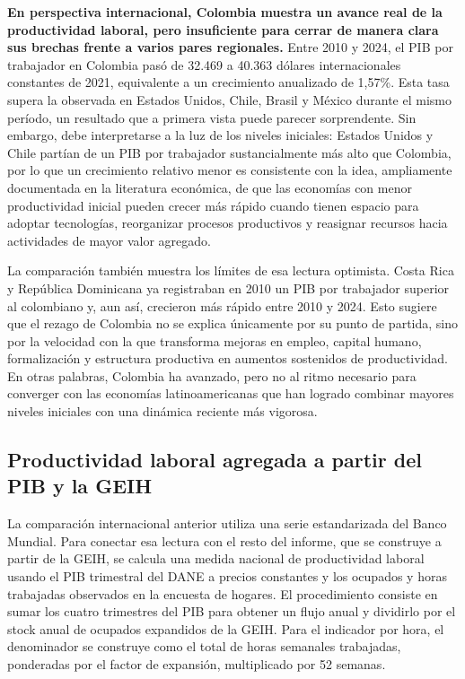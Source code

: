 \textbf{En perspectiva internacional, Colombia muestra un avance real de la productividad laboral, pero insuficiente para cerrar de manera clara sus brechas frente a varios pares regionales.} Entre 2010 y 2024, el PIB por trabajador en Colombia pasó de 32.469 a 40.363 dólares internacionales constantes de 2021, equivalente a un crecimiento anualizado de 1,57\%. Esta tasa supera la observada en Estados Unidos, Chile, Brasil y México durante el mismo período, un resultado que a primera vista puede parecer sorprendente. Sin embargo, debe interpretarse a la luz de los niveles iniciales: Estados Unidos y Chile partían de un PIB por trabajador sustancialmente más alto que Colombia, por lo que un crecimiento relativo menor es consistente con la idea, ampliamente documentada en la literatura económica, de que las economías con menor productividad inicial pueden crecer más rápido cuando tienen espacio para adoptar tecnologías, reorganizar procesos productivos y reasignar recursos hacia actividades de mayor valor agregado.

La comparación también muestra los límites de esa lectura optimista. Costa Rica y República Dominicana ya registraban en 2010 un PIB por trabajador superior al colombiano y, aun así, crecieron más rápido entre 2010 y 2024. Esto sugiere que el rezago de Colombia no se explica únicamente por su punto de partida, sino por la velocidad con la que transforma mejoras en empleo, capital humano, formalización y estructura productiva en aumentos sostenidos de productividad. En otras palabras, Colombia ha avanzado, pero no al ritmo necesario para converger con las economías latinoamericanas que han logrado combinar mayores niveles iniciales con una dinámica reciente más vigorosa.

\subsection{Productividad laboral agregada a partir del PIB y la GEIH}

La comparación internacional anterior utiliza una serie estandarizada del Banco Mundial. Para conectar esa lectura con el resto del informe, que se construye a partir de la GEIH, se calcula una medida nacional de productividad laboral usando el PIB trimestral del DANE a precios constantes y los ocupados y horas trabajadas observados en la encuesta de hogares. El procedimiento consiste en sumar los cuatro trimestres del PIB para obtener un flujo anual y dividirlo por el stock anual de ocupados expandidos de la GEIH. Para el indicador por hora, el denominador se construye como el total de horas semanales trabajadas, ponderadas por el factor de expansión, multiplicado por 52 semanas.

